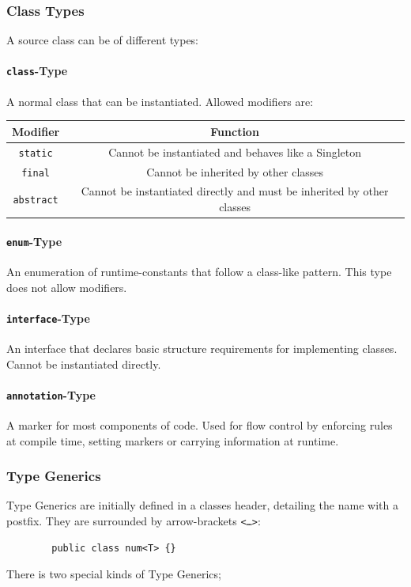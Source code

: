 \documentclass{docs}
\begin{document}
    \subsubsection{Class Types}
    A source class can be of different types:
    
    \label{langClass}
    \paragraph{\texttt{class}-Type}
    A normal class that can be instantiated.
    Allowed modifiers are:
    \begin{center}
    \begin{tabular}{c|c}
        Modifier & Function \\
        \hline
        \texttt{static} & Cannot be instantiated and behaves like a Singleton \\
        \texttt{final} & Cannot be inherited by other classes \\
        \texttt{abstract} & Cannot be instantiated directly and must be inherited by other classes
    \end{tabular}
    \end{center}
    
    \label{langEnum}
    \paragraph{\texttt{enum}-Type}
    An enumeration of runtime-constants that follow a class-like pattern.
    This type does not allow modifiers.
    
    \label{langInterface}
    \paragraph{\texttt{interface}-Type}
    An interface that declares basic structure requirements for implementing classes.
    Cannot be instantiated directly.
    
    \label{langAnnotation}
    \paragraph{\texttt{annotation}-Type}
    A marker for most components of code. Used for flow control by enforcing rules at compile time, setting markers or carrying information at runtime.

    \label{langGenerics}    
    \subsubsection{Type Generics}
    Type Generics are initially defined in a classes header, detailing the name with a postfix.
    They are surrounded by arrow-brackets \texttt{<\dots>}:
    \begin{verbatim}
        public class num<T> {}
    \end{verbatim}
    There is two special kinds of Type Generics;
    
\end{document}
